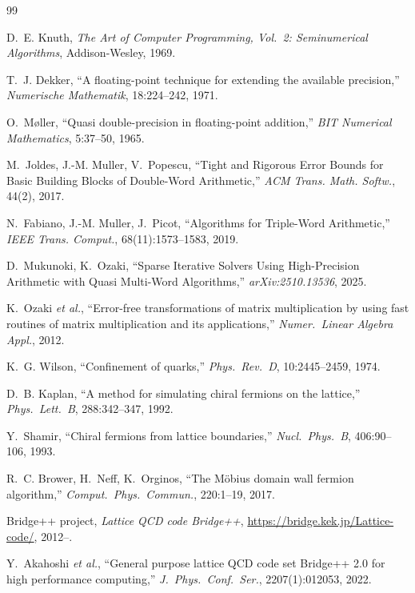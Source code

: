 \documentclass[12pt,a4paper]{article}
\begin{document}
\begin{thebibliography}{99}

D.~E. Knuth,
\textit{The Art of Computer Programming, Vol.~2: Seminumerical Algorithms},
Addison-Wesley, 1969.

T.~J. Dekker,
``A floating-point technique for extending the available precision,''
\textit{Numerische Mathematik}, 18:224--242, 1971.

O.~M{\o}ller,
``Quasi double-precision in floating-point addition,''
\textit{BIT Numerical Mathematics}, 5:37--50, 1965.

M.~Joldes, J.-M. Muller, V.~Popescu,
``Tight and Rigorous Error Bounds for Basic Building Blocks of Double-Word Arithmetic,''
\textit{ACM Trans. Math. Softw.}, 44(2), 2017.

N.~Fabiano, J.-M. Muller, J.~Picot,
``Algorithms for Triple-Word Arithmetic,''
\textit{IEEE Trans. Comput.}, 68(11):1573--1583, 2019.

D.~Mukunoki, K.~Ozaki,
``Sparse Iterative Solvers Using High-Precision Arithmetic with Quasi Multi-Word Algorithms,''
\textit{arXiv:2510.13536}, 2025.

K.~Ozaki \textit{et al.},
``Error-free transformations of matrix multiplication by using fast routines of matrix multiplication and its applications,''
\textit{Numer.\ Linear Algebra Appl.}, 2012.

K.~G. Wilson,
``Confinement of quarks,''
\textit{Phys.\ Rev.\ D}, 10:2445--2459, 1974.

D.~B. Kaplan,
``A method for simulating chiral fermions on the lattice,''
\textit{Phys.\ Lett.\ B}, 288:342--347, 1992.

Y.~Shamir,
``Chiral fermions from lattice boundaries,''
\textit{Nucl.\ Phys.\ B}, 406:90--106, 1993.

R.~C. Brower, H.~Neff, K.~Orginos,
``The M\"obius domain wall fermion algorithm,''
\textit{Comput.\ Phys.\ Commun.}, 220:1--19, 2017.

Bridge++ project,
\textit{Lattice QCD code Bridge++},
\url{https://bridge.kek.jp/Lattice-code/}, 2012--.

Y.~Akahoshi \textit{et al.},
``General purpose lattice QCD code set Bridge++ 2.0 for high performance computing,''
\textit{J.\ Phys.\ Conf.\ Ser.}, 2207(1):012053, 2022.


\end{thebibliography}
\end{document}
